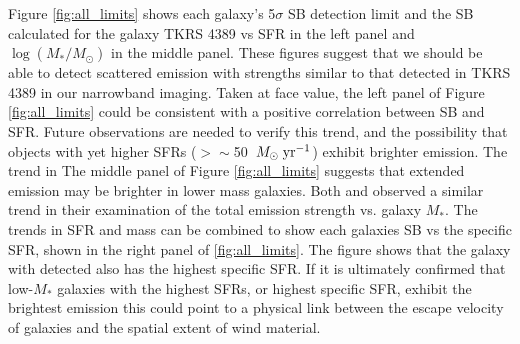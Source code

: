 \documentclass[twocolumn]{aastex61}
\def \msunperyr {{\; M_{\odot}\rm \;yr^{-1}}}
\begin{document}

Figure \ref{fig:all_limits} shows each galaxy's 5$\sigma$ SB detection limit and the SB calculated for the galaxy TKRS 4389 vs SFR in the left panel and $\log(M_*/M_{\odot})$ in the middle panel. These figures suggest that we should be able to detect scattered  emission with strengths similar to that detected in TKRS 4389 in our narrowband imaging. Taken at face value, the left panel of Figure \ref{fig:all_limits} could be consistent with a positive correlation between  SB and SFR. Future observations are needed to verify this trend, and the possibility that objects with yet higher SFRs ($>\sim$50 $\msunperyr$) exhibit brighter  emission. The trend in The middle panel of Figure \ref{fig:all_limits} suggests that extended  emission may be brighter in lower mass galaxies. Both \cite{Erb2012} and \cite{Feltre2018} observed a similar trend in their examination of the total  emission strength vs. galaxy $M_*$. The trends in SFR and mass can be combined to show each galaxies SB vs the specific SFR, shown in the right panel of \ref{fig:all_limits}. The figure shows that the galaxy with detected  also has the highest specific SFR. If it is ultimately confirmed that low-$M_*$ galaxies with the highest SFRs, or highest specific SFR, exhibit the brightest emission this could point to a physical link between the escape velocity of galaxies and the spatial extent of wind material. 
\end{document}
